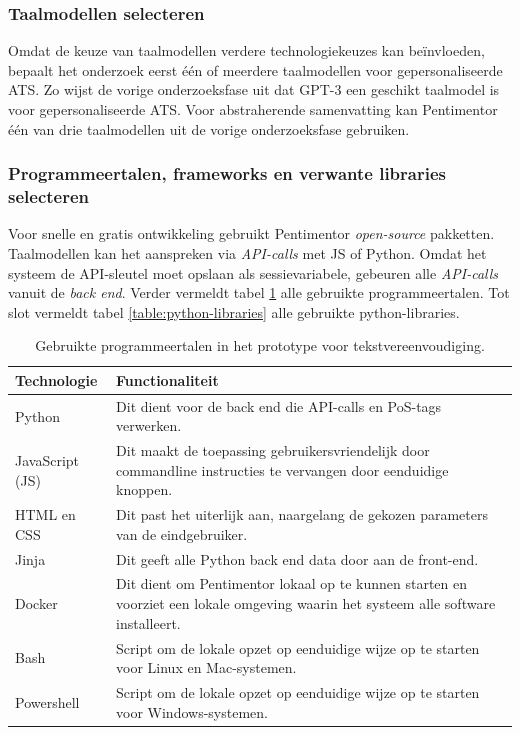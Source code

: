 \subsubsection{Taalmodellen selecteren}

Omdat de keuze van taalmodellen verdere technologiekeuzes kan beïnvloeden, bepaalt het onderzoek eerst één of meerdere taalmodellen voor gepersonaliseerde ATS. Zo wijst de vorige onderzoeksfase uit dat GPT-3 een geschikt taalmodel is voor gepersonaliseerde ATS. Voor abstraherende samenvatting kan Pentimentor één van drie taalmodellen uit de vorige onderzoeksfase gebruiken.

\subsubsection{Programmeertalen, frameworks en verwante libraries selecteren}

Voor snelle en gratis ontwikkeling gebruikt Pentimentor \textit{open-source} pakketten. Taalmodellen kan het aanspreken via \textit{API-calls} met JS of Python. Omdat het systeem de API-sleutel moet opslaan als sessievariabele, gebeuren alle \textit{API-calls} vanuit de \textit{back end}. Verder vermeldt tabel \ref{table:technologies} alle gebruikte programmeertalen. Tot slot vermeldt tabel \ref{table:python-libraries} alle gebruikte python-libraries.

\begin{center}
	\begin{table}[H]
	\begin{tabular}{ | m{4cm} | m{11cm} | } 
		\hline
		\textbf{Technologie} 	& \textbf{Functionaliteit} \\
		\hline
		Python 					& Dit dient voor de back end die API-calls en PoS-tags verwerken. \\
		\hline
		JavaScript (JS)			& Dit maakt de toepassing gebruikersvriendelijk door commandline instructies te vervangen door eenduidige knoppen. \\
		\hline
		HTML en CSS 			& Dit past het uiterlijk aan, naargelang de gekozen parameters van de eindgebruiker. \\
		\hline
		Jinja 					& Dit geeft alle Python back end data door aan de front-end.  \\
		\hline
		Docker 					& Dit dient om Pentimentor lokaal op te kunnen starten en voorziet een lokale omgeving waarin het systeem alle software installeert. \\
		\hline
		Bash					& Script om de lokale opzet op eenduidige wijze op te starten voor Linux en Mac-systemen. \\
		\hline
		Powershell 				& Script om de lokale opzet op eenduidige wijze op te starten voor Windows-systemen. \\
		\hline
	\end{tabular}
	\caption{Gebruikte programmeertalen in het prototype voor tekstvereenvoudiging.}
	\label{table:technologies}
	\end{table}
\end{center}

